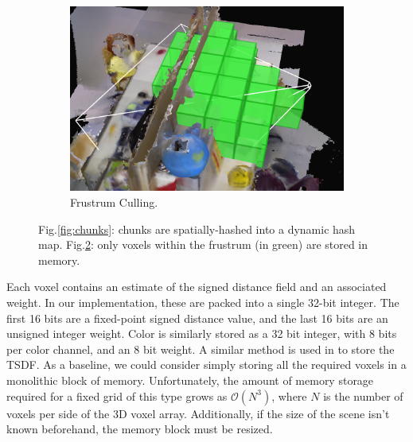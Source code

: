 \documentclass[conference]{IEEEtran}
\newcommand{\figref}[1]{Fig.\ref{#1}}
\newcommand{\TSDF}{TSDF\xspace}
\begin{document}
\begin{figure}[t!]
 	  \begin{subfigure}[b]{0.55\linewidth} \centering
 	  	  \hspace{-5em}
	      \includegraphics[width=1.0\textwidth]{img/frustum_cull}
	      \caption{Frustrum Culling.}
	 	 \label{fig:frustum_cull}
	  \end{subfigure}
	  \caption{\figref{fig:chunks}: chunks are spatially-hashed \cite{SpatialHashing} into a
      dynamic hash map. 
      \figref{fig:frustum_cull}: only voxels within the frustrum (in green) are stored in memory.}
\end{figure} 

Each voxel contains an estimate of the signed distance field and an
associated weight. In our implementation, these are packed into a single 32-bit
integer. The first 16 bits are a fixed-point signed distance value, and the
last 16 bits  are an unsigned integer weight. Color is similarly
stored as a 32 bit integer, with 8 bits per color channel, and an 8 bit weight.
A similar method is used in \cite{Newcombe, Whelan2013, Bylow2013, NiessnerHashing} to store
the \TSDF. As a baseline, we could consider simply storing all the required
voxels in a monolithic block of memory. Unfortunately, the amount of memory storage required
for a fixed grid of this type grows as $\mathcal{O}(N^3)$, where $N$ is the
number of voxels per side of the 3D voxel array. Additionally, if the size of
the scene isn't known beforehand, the memory block must be resized.

\end{document}

